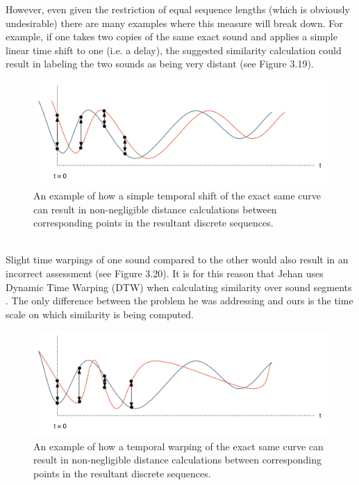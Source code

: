 \documentclass[a4paper,12pt]{report} 	%
\numberwithin{figure}{chapter}
\numberwithin{table}{chapter}
\numberwithin{equation}{chapter}
\begin{document}
\begin{flushleft}
However, even given the restriction of equal sequence lengths (which is obviously undesirable) there are many examples where this measure will break down. For example, if one takes two copies of the same exact sound and applies a simple linear time shift to one (i.e. a delay), the suggested similarity calculation could result in labeling the two sounds as being very distant (see Figure 3.19).
\begin{figure}[h!]
\begin{center}
\includegraphics[scale=0.6]{TimbreDistance3}
\caption[Timbre Distance Between Time-Shifted Curves]{An example of how a simple temporal shift of the exact same curve can result in non-negligible distance calculations between corresponding points in the resultant discrete sequences.}
\end{center}
\end{figure}
\\
Slight time warpings of one sound compared to the other would also result in an incorrect assessment (see Figure 3.20). It is for this reason that Jehan uses Dynamic Time Warping (DTW) when calculating similarity over sound segments \cite{Jehan:2005fy}. The only difference between the problem he was addressing and ours is the time scale on which similarity is being computed. 
\begin{figure}[h!]
\begin{center}
\includegraphics[scale=0.6]{TimbreDistance4}
\caption[Timbre Distance Between Time-Warped Curves]{An example of how a temporal warping of the exact same curve can result in non-negligible distance calculations between corresponding points in the resultant discrete sequences.}

\end{center}
\end{figure}
\end{flushleft}
\end{document}
